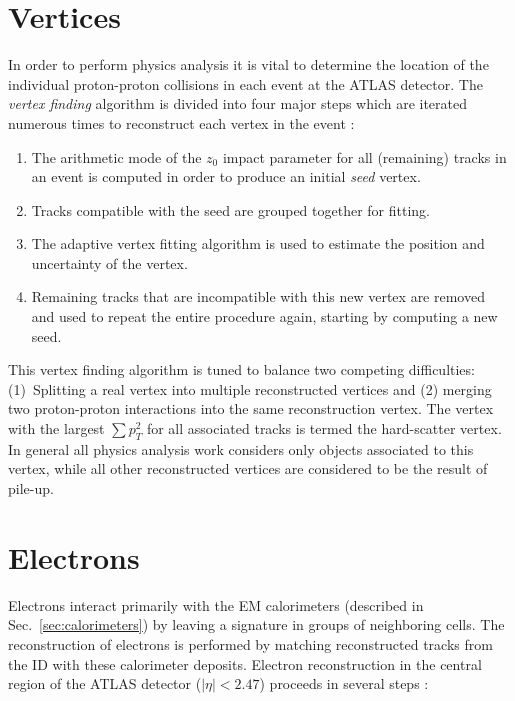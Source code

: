 \section{Vertices}
In order to perform physics analysis it is vital to determine the location of the individual proton-proton collisions in each event at the ATLAS detector.
The \textit{vertex finding} algorithm is divided into four major steps which are iterated numerous times to reconstruct each vertex in the event  \cite{Borissov:2015djv}:
\begin{enumerate}
    \item 
        The arithmetic mode of the $z_0$ impact parameter for all (remaining) tracks in an event is computed in order to produce an initial \textit{seed} vertex.
    \item 
        Tracks compatible with the seed are grouped together for fitting.
    \item 
        The adaptive vertex fitting algorithm is used to estimate the position and uncertainty of the vertex.
    \item
        Remaining tracks that are incompatible with this new vertex are removed and used to repeat the entire procedure again, starting by computing a new seed.
\end{enumerate}
This vertex finding algorithm is tuned to balance two competing difficulties: (1)~Splitting a real vertex into multiple reconstructed vertices and (2) merging two proton-proton interactions into the same reconstruction vertex. 
The vertex with the largest $\sum p_T^2$ for all associated tracks is termed the hard-scatter vertex. In general all physics analysis work considers only objects associated to this vertex, while all other reconstructed vertices are considered to be the result of pile-up.

\section{Electrons}
Electrons interact primarily with the EM calorimeters (described in Sec.~\ref{sec:calorimeters}) by leaving a signature in groups of neighboring cells.
The reconstruction of electrons is performed by matching reconstructed tracks from the ID with these calorimeter deposits.
Electron reconstruction in the central region of the ATLAS detector ($|\eta| < 2.47$) proceeds in several steps \cite{ATLAS-CONF-2016-024}:

